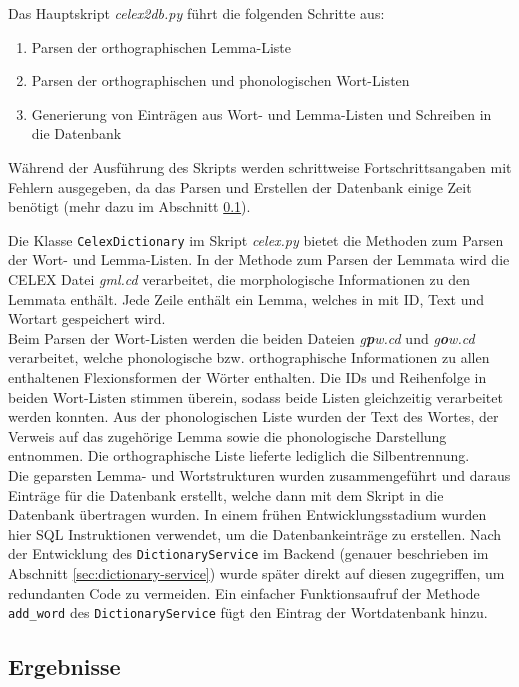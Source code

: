 Das Hauptskript \textit{celex2db.py} führt die folgenden Schritte aus:
\begin{enumerate}
	\item Parsen der orthographischen Lemma-Liste
	\item Parsen der orthographischen und phonologischen Wort-Listen
	\item Generierung von Einträgen aus Wort- und Lemma-Listen und Schreiben in die Datenbank
\end{enumerate}

Während der Ausführung des Skripts werden schrittweise Fortschrittsangaben mit Fehlern ausgegeben, da das Parsen und Erstellen der Datenbank einige Zeit benötigt (mehr dazu im Abschnitt \ref{sec:database-results}).

Die Klasse \texttt{CelexDictionary} im Skript \textit{celex.py} bietet die Methoden zum Parsen der Wort- und Lemma-Listen. In der Methode zum Parsen der Lemmata wird die CELEX Datei \textit{gml.cd} verarbeitet, die morphologische Informationen zu den Lemmata enthält. Jede Zeile enthält ein Lemma, welches in mit ID, Text und Wortart gespeichert wird.\\
Beim Parsen der Wort-Listen werden die beiden Dateien \textit{g\textbf{p}w.cd} und \textit{g\textbf{o}w.cd} verarbeitet, welche phonologische bzw. orthographische Informationen zu allen enthaltenen Flexionsformen der Wörter enthalten. Die IDs und Reihenfolge in beiden Wort-Listen stimmen überein, sodass beide Listen gleichzeitig verarbeitet werden konnten. Aus der phonologischen Liste wurden der Text des Wortes, der Verweis auf das zugehörige Lemma sowie die phonologische Darstellung entnommen. Die orthographische Liste lieferte lediglich die Silbentrennung.\\
Die geparsten Lemma- und Wortstrukturen wurden zusammengeführt und daraus Einträge für die Datenbank erstellt, welche dann mit dem Skript  in die Datenbank übertragen wurden. In einem frühen Entwicklungsstadium wurden hier SQL Instruktionen verwendet, um die Datenbankeinträge zu erstellen. Nach der Entwicklung des \texttt{DictionaryService} im Backend (genauer beschrieben im Abschnitt \ref{sec:dictionary-service}) wurde später direkt auf diesen zugegriffen, um redundanten Code zu vermeiden. Ein einfacher Funktionsaufruf der Methode \texttt{add\_word} des \texttt{DictionaryService} fügt den Eintrag der Wortdatenbank hinzu.

\subsection{Ergebnisse}
\label{sec:database-results}

